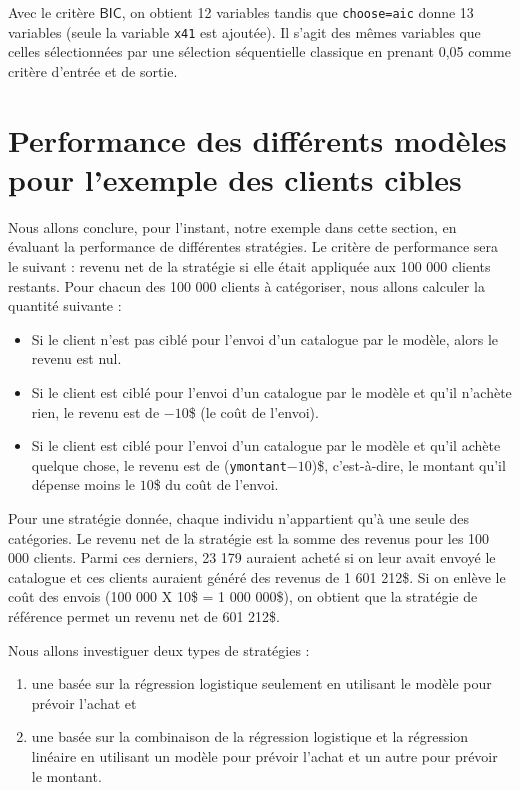 \documentclass[
  11pt,
  letterpaper,
]{book}
\providecommand{\tightlist}{%
  \setlength{\itemsep}{0pt}\setlength{\parskip}{0pt}}
\theoremstyle{definition}
\theoremstyle{definition}
\theoremstyle{definition}
\theoremstyle{remark}
\begin{document}
Avec le critère \(\mathsf{BIC}\), on obtient 12 variables tandis que \texttt{choose=aic} donne 13 variables (seule la variable \texttt{x41} est ajoutée). Il s'agit des mêmes variables que celles sélectionnées par une sélection séquentielle classique en prenant 0,05 comme critère d'entrée et de sortie.

\hypertarget{performance-des-diffuxe9rents-moduxe8les-pour-lexemple-des-clients-cibles}{%
\section{Performance des différents modèles pour l'exemple des clients cibles}\label{performance-des-diffuxe9rents-moduxe8les-pour-lexemple-des-clients-cibles}}

Nous allons conclure, pour l'instant, notre exemple dans cette section, en évaluant la performance de différentes stratégies. Le critère de performance sera le suivant : revenu net de la stratégie si elle était appliquée aux 100 000 clients restants. Pour chacun des 100 000 clients à catégoriser, nous allons calculer la quantité suivante :

\begin{itemize}
\tightlist
\item
  Si le client n'est pas ciblé pour l'envoi d'un catalogue par le modèle, alors le revenu est nul.
\item
  Si le client est ciblé pour l'envoi d'un catalogue par le modèle et qu'il n'achète rien, le revenu est de \(-10\)\$ (le coût de l'envoi).
\item
  Si le client est ciblé pour l'envoi d'un catalogue par le modèle et qu'il achète quelque chose, le revenu est de (\texttt{ymontant}\(-10\))\$, c'est-à-dire, le montant qu'il dépense moins le \(10\)\$ du coût de l'envoi.
\end{itemize}

Pour une stratégie donnée, chaque individu n'appartient qu'à une seule des catégories. Le revenu net de la stratégie est la somme des revenus pour les 100 000 clients. Parmi ces derniers, 23 179 auraient acheté si on leur avait envoyé le catalogue et ces clients auraient généré des revenus de 1 601 212\$. Si on enlève le coût des envois (100 000 X 10\$ = 1 000 000\$), on obtient que la stratégie de référence permet un revenu net de 601 212\$.

Nous allons investiguer deux types de stratégies :

\begin{enumerate}
\def\labelenumi{\arabic{enumi})}
\tightlist
\item
  une basée sur la régression logistique seulement en utilisant le modèle pour prévoir l'achat et
\item
  une basée sur la combinaison de la régression logistique et la régression linéaire en utilisant un modèle pour prévoir l'achat et un autre pour prévoir le montant.
\end{enumerate}
\end{document}
